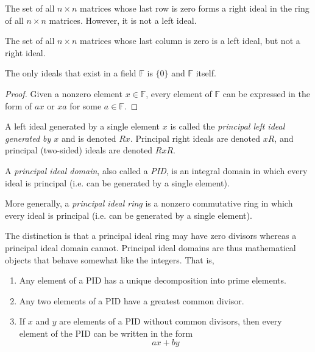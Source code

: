 \documentclass{article}
\begin{document}
    \begin{example}
      The set of all $n \times n$ matrices whose last row is zero forms a right ideal in the ring of all $n \times n$ matrices. However, it is not a left ideal.

      The set of all $n\times n$ matrices whose last column is zero is a left ideal, but not a right ideal. 
    \end{example}

    \begin{proposition}
      The only ideals that exist in a field $\mathbb{F}$ is $\{0\}$ and $\mathbb{F}$ itself. 
    \end{proposition}
    \begin{proof}
      Given a nonzero element $x \in \mathbb{F}$, every element of $\mathbb{F}$ can be expressed in the form of $a x$ or $x a$ for some $a \in \mathbb{F}$. 
    \end{proof}

    \begin{definition}
      A left ideal generated by a single element $x$ is called the \textit{principal left ideal generated by $x$} and is denoted $R x$. Principal right ideals are denoted $x R$, and principal (two-sided) ideals are denoted $R x R$. 
    \end{definition}

    \begin{definition}
      A \textit{principal ideal domain}, also called a \textit{PID}, is an integral domain in which every ideal is principal (i.e. can be generated by a single element). 

      More generally, a \textit{principal ideal ring} is a nonzero commutative ring in which every ideal is principal (i.e. can be generated by a single element). 
    \end{definition}

    The distinction is that a principal ideal ring may have zero divisors whereas a principal ideal domain cannot. Principal ideal domains are thus mathematical objects that behave somewhat like the integers. That is, 
    \begin{enumerate}
      \item Any element of a PID has a unique decomposition into prime elements. 
      \item Any two elements of a PID have a greatest common divisor. 
      \item If $x$ and $y$ are elements of a PID without common divisors, then every element of the PID can be written in the form 
        \begin{equation}
          a x + b y
        \end{equation}
    \end{enumerate}
\end{document}
